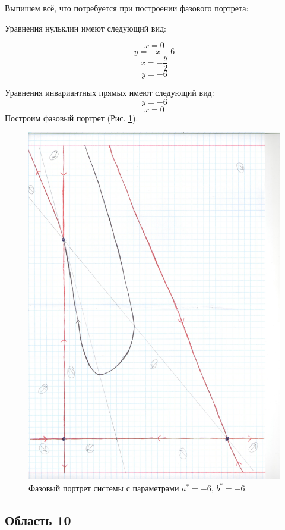 Выпишем всё, что потребуется при построении фазового портрета:

Уравнения нульклин имеют следующий вид: 

$$x=0$$
$$y=- x - 6$$
$$x=- \frac{y}{2}$$
$$y=-6$$


Уравнения инвариантных прямых имеют следующий вид: 
$$y = -6$$
$$x = 0$$
Построим фазовый портрет (Рис. \ref{fig:phportr9}).

\begin{figure}[h]
	
	\includegraphics[width=\textwidth]{phptr/(-6, 0).jpg}
	\centering
	\caption{\label{fig:phportr9} Фазовый портрет системы с параметрами $a^\ast = -6$, $b^\ast = -6$.}
	
\end{figure}

\subsection{Область 10}

